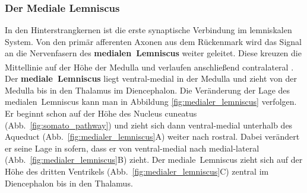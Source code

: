 \documentclass[12pt,a4paper,pdftex]{article}
\begin{document}
\subsubsection*{Der Mediale Lemniscus}
In den Hinterstrangkernen ist die erste synaptische Verbindung im lemniskalen System. Von den primär afferenten Axonen aus dem Rückenmark wird das Signal an die Nervenfasern des \textbf{medialen~Lemniscus}  weiter geleitet. Diese kreuzen die Mittellinie auf der Höhe der Medulla und verlaufen anschließend contralateral \textsuperscript{\cite[22]{kandel2013principles}}. 
Der \textbf{mediale~Lemniscus} liegt ventral-medial in der Medulla und zieht von der Medulla bis in den Thalamus im Diencephalon. Die Veränderung der Lage des medialen~Lemniscus  kann man in Abbildung \ref{fig:medialer_lemniscus} verfolgen. Er beginnt schon auf der Höhe des Nucleus cuneatus (Abb.~\ref{fig:somato_pathway}) und zieht sich dann ventral-medial unterhalb des Aqueduct (Abb.~\ref{fig:medialer_lemniscus}A) weiter nach rostral. Dabei verändert er seine Lage in sofern, dass er von ventral-medial nach medial-lateral (Abb.~\ref{fig:medialer_lemniscus}B) zieht. Der mediale~Lemniscus zieht sich auf der Höhe des dritten Ventrikels (Abb.~\ref{fig:medialer_lemniscus}C) zentral im Diencephalon bis in den Thalamus.
\end{document}
